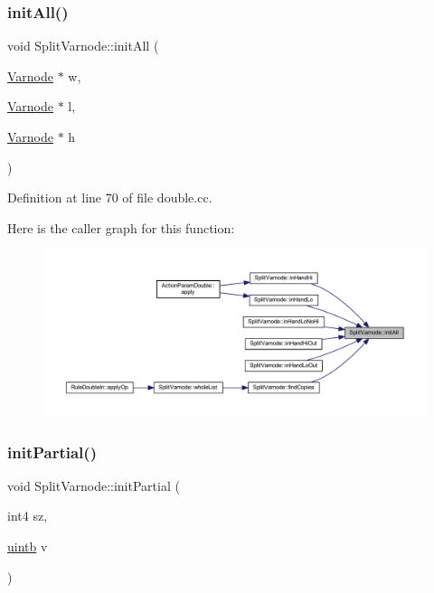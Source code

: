 \subsubsection{\texorpdfstring{initAll()}{initAll()}}
{\footnotesize\ttfamily void Split\+Varnode\+::init\+All (\begin{DoxyParamCaption}\item[{\mbox{\hyperlink{class_varnode}{Varnode}} $\ast$}]{w,  }\item[{\mbox{\hyperlink{class_varnode}{Varnode}} $\ast$}]{l,  }\item[{\mbox{\hyperlink{class_varnode}{Varnode}} $\ast$}]{h }\end{DoxyParamCaption})}



Definition at line 70 of file double.\+cc.

Here is the caller graph for this function\+:
\nopagebreak
\begin{figure}[H]
\begin{center}
\leavevmode
\includegraphics[width=350pt]{class_split_varnode_a9acc5b01b242ad7d852ec86a1af62b51_icgraph}
\end{center}
\end{figure}
\mbox{\label{class_split_varnode_a858758ae5cd0507de5f06fc966e10156}} 
\subsubsection{\texorpdfstring{initPartial()}{initPartial()}\hspace{0.1cm}{\footnotesize\ttfamily [1/2]}}
{\footnotesize\ttfamily void Split\+Varnode\+::init\+Partial (\begin{DoxyParamCaption}\item[{int4}]{sz,  }\item[{\mbox{\hyperlink{types_8h_a2db313c5d32a12b01d26ac9b3bca178f}{uintb}}}]{v }\end{DoxyParamCaption})}



